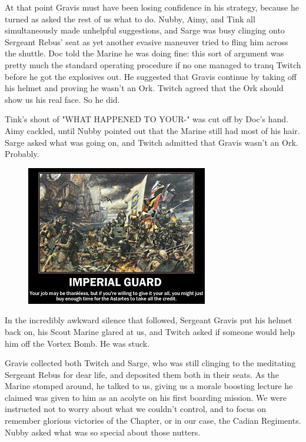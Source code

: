 At that point Gravis must have been losing confidence in his strategy, because he turned as asked the rest of us what to do. 
Nubby, Aimy, and Tink all simultaneously made unhelpful suggestions, and Sarge was busy clinging onto Sergeant Rebus' seat as yet another evasive maneuver tried to fling him across the shuttle. 
Doc told the Marine he was doing fine: 
this sort of argument was pretty much the standard operating procedure if no one managed to tranq Twitch before he got the explosives out. 
He suggested that Gravis continue by taking off his helmet and proving he wasn't an Ork. 
Twitch agreed that the Ork should show us his real face. 
So he did.

Tink's shout of "WHAT HAPPENED TO YOUR-" was cut off by Doc's hand. 
Aimy cackled, until Nubby pointed out that the Marine still had most of his hair. 
Sarge asked what was going on, and Twitch admitted that Gravis wasn't an Ork. 
Probably.

\begin{figure}
	\begin{center}
		\includegraphics[width=\figwidth]{pics/12/32.png}
	\end{center}
\end{figure}
In the incredibly awkward silence that followed, Sergeant Gravis put his helmet back on, his Scout Marine glared at us, and Twitch asked if someone would help him off the Vortex Bomb. 
He was stuck.

Gravis collected both Twitch and Sarge, who was still clinging to the meditating Sergeant Rebus for dear life, and deposited them both in their seats. 
As the Marine stomped around, he talked to us, giving us a morale boosting lecture he claimed was given to him as an acolyte on his first boarding mission. 
We were instructed not to worry about what we couldn't control, and to focus on remember glorious victories of the Chapter, or in our case, the Cadian Regiments. 
Nubby asked what was so special about those nutters. 


